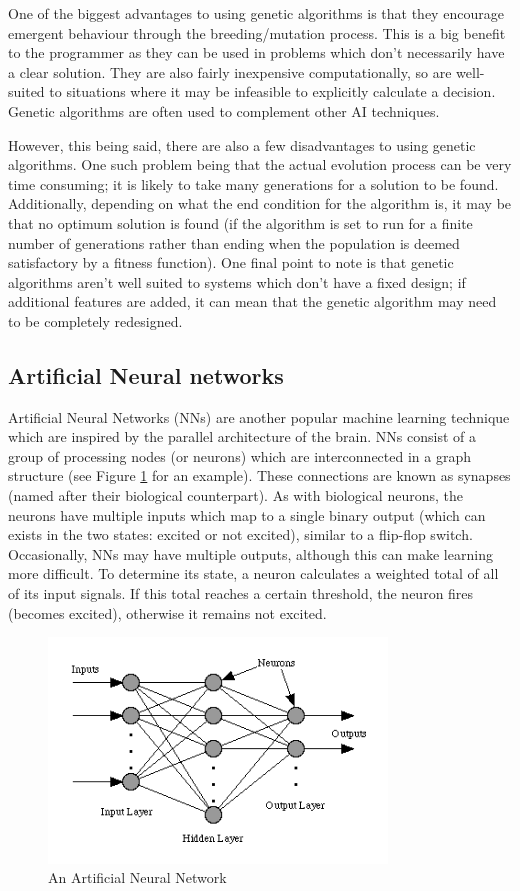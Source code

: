 \documentclass[a4paper,oneside]{report}
\begin{document}
One of the biggest advantages to using genetic algorithms is that they encourage emergent behaviour through the breeding/mutation process. This is a big benefit to the programmer as they can be used in problems which don't necessarily have a clear solution. They are also fairly inexpensive computationally, so are well-suited to situations where it may be infeasible to explicitly calculate a decision. Genetic algorithms are often used to complement other AI techniques.

However, this being said, there are also a few disadvantages to using genetic algorithms. One such problem being that the actual evolution process can be very time consuming; it is likely to take many generations for a solution to be found. Additionally, depending on what the end condition for the algorithm is, it may be that no optimum solution is found (if the algorithm is set to run for a finite number of generations rather than ending when the population is deemed satisfactory by a fitness function). One final point to note is that genetic algorithms aren't well suited to systems which don't have a fixed design; if additional features are added, it can mean that the genetic algorithm may need to be completely redesigned.

\subsection{Artificial Neural networks}

Artificial Neural Networks (NNs) are another popular machine learning technique which are inspired by the parallel architecture of the brain. NNs consist of a group of processing nodes (or neurons) which are interconnected in a graph structure (see Figure \ref{fig:NeuralNet} for an example). These connections are known as synapses (named after their biological counterpart). As with biological neurons, the neurons have multiple inputs which map to a single binary output (which can exists in the two states: excited or not excited), similar to a flip-flop switch. Occasionally, NNs may have multiple outputs, although this can make learning more difficult. To determine its state, a neuron calculates a weighted total of all of its input signals. If this total reaches a certain threshold, the neuron fires (becomes excited), otherwise it remains not excited. 

\begin{figure}[h!]
	\centering
		\includegraphics[width=90mm]{sources/images/NeuralNetwork}
    	\caption{An Artificial Neural Network \cite{Dawson:2000uq}}
    	\label{fig:NeuralNet}
\end{figure}
\end{document}
